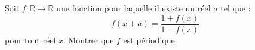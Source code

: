 Soit $f : \mathbb{R} \to \mathbb{R}$ une fonction pour laquelle il existe un réel $a$ tel que :
\[
f(x + a) = \frac{1 + f(x)}{1 - f(x)}
\]
pour tout réel $x$. Montrer que $f$ est périodique.
